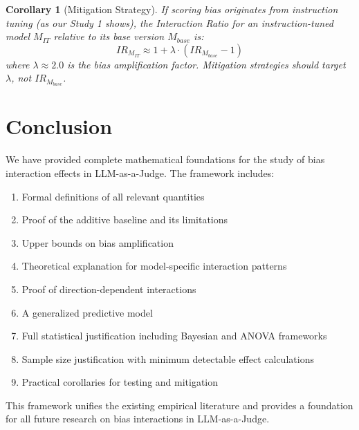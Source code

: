 \documentclass[11pt]{article}
\newtheorem{corollary}{Corollary}
\begin{document}
\begin{corollary}[Mitigation Strategy]
If scoring bias originates from instruction tuning (as our Study 1 shows), the Interaction Ratio for an instruction-tuned model $M_{IT}$ relative to its base version $M_{base}$ is:
\begin{equation}
IR_{M_{IT}} \approx 1 + \lambda \cdot (IR_{M_{base}} - 1)
\end{equation}
where $\lambda \approx 2.0$ is the bias amplification factor. Mitigation strategies should target $\lambda$, not $IR_{M_{base}}$.
\end{corollary}

\section{Conclusion}

We have provided complete mathematical foundations for the study of bias interaction effects in LLM-as-a-Judge. The framework includes:
\begin{enumerate}
    \item Formal definitions of all relevant quantities
    \item Proof of the additive baseline and its limitations
    \item Upper bounds on bias amplification
    \item Theoretical explanation for model-specific interaction patterns
    \item Proof of direction-dependent interactions
    \item A generalized predictive model
    \item Full statistical justification including Bayesian and ANOVA frameworks
    \item Sample size justification with minimum detectable effect calculations
    \item Practical corollaries for testing and mitigation
\end{enumerate}

This framework unifies the existing empirical literature and provides a foundation for all future research on bias interactions in LLM-as-a-Judge.
\end{document}

